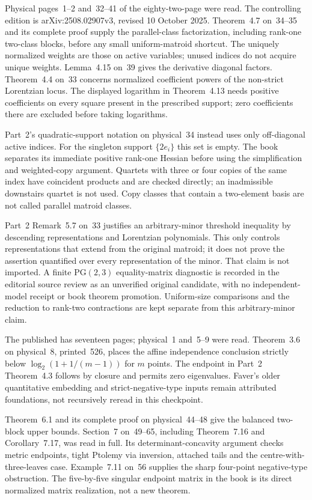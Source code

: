 Physical pages~1--2 and~32--41 of the eighty-two-page
\cite{BakerHuhKummerLorscheid25TopologicalV3} were read.
The controlling edition is arXiv:2508.02907v3,
revised 10 October 2025.
Theorem~4.7 on~34--35 and its complete proof supply the
parallel-class factorization, including rank-one two-class
blocks, before any small uniform-matroid shortcut.
The uniquely normalized weights are those on active
variables; unused indices do not acquire unique weights.
Lemma~4.15 on~39 gives the derivative diagonal factors.
Theorem~4.4 on~33 concerns normalized coefficient powers
of the non-strict Lorentzian locus. The displayed logarithm
in Theorem~4.13 needs positive coefficients on every square
present in the prescribed support; zero coefficients there
are excluded before taking logarithms.

Part~2's quadratic-support notation on physical~34 instead
uses only off-diagonal active indices. For the singleton
support $\{2e_i\}$ this set is empty. The book separates
its immediate positive rank-one Hessian before using the
simplification and weighted-copy argument. Quartets with
three or four copies of the same index have coincident
products and are checked directly; an inadmissible
downstairs quartet is not used. Copy classes that contain
a two-element basis are not called parallel matroid classes.

Part~2 Remark~5.7 on~33 justifies an arbitrary-minor
threshold inequality by descending representations and
Lorentzian polynomials. This only controls representations
that extend from the original matroid; it does not prove
the assertion quantified over every representation of the
minor. That claim is not imported. A finite PG$(2,3)$
equality-matrix diagnostic is recorded in the editorial
source review as an unverified original candidate, with
no independent-model receipt or book theorem promotion.
Uniform-size comparisons and the reduction to rank-two
contractions are kept separate from this arbitrary-minor
claim.

The published \cite{FaverEtAl14RoundnessPublished} has
seventeen pages; physical~1 and~5--9 were read.
Theorem~3.6 on physical~8, printed~526, places the affine
independence conclusion strictly below
$\log_2(1+1/(m-1))$ for $m$ points. The endpoint in
Part~2 Theorem~4.3 follows by closure and permits zero
eigenvalues. Faver's older quantitative embedding and
strict-negative-type inputs remain attributed foundations,
not recursively reread in this checkpoint.

Theorem~6.1 and its complete proof on physical~44--48
give the balanced two-block upper bounds. Section~7
on~49--65, including Theorem~7.16 and Corollary~7.17,
was read in full. Its determinant-concavity argument
checks metric endpoints, tight Ptolemy via inversion,
attached tails and the centre-with-three-leaves case.
Example~7.11 on~56 supplies the sharp four-point
negative-type obstruction. The five-by-five singular
endpoint matrix in the book is its direct normalized
matrix realization, not a new theorem.


